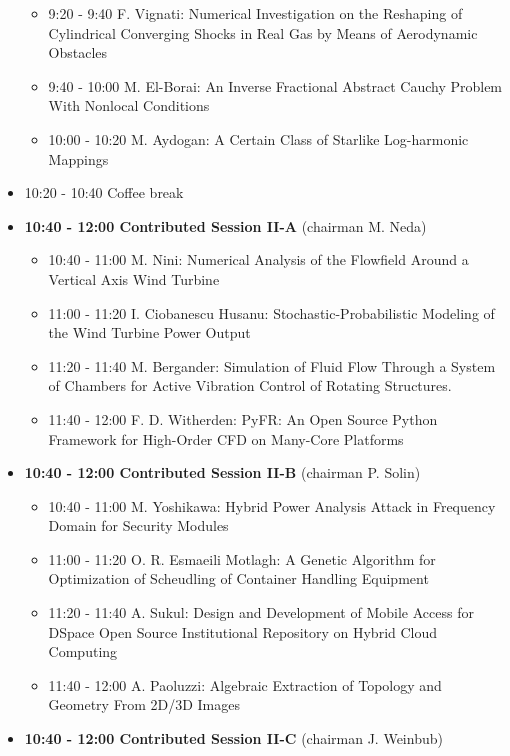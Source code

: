 \documentclass[10pt]{article}%
\begin{document}
\begin{itemize}
\begin{itemize}
    \item 9:20 - 9:40 {F. Vignati}: {Numerical Investigation on the Reshaping of Cylindrical Converging Shocks in Real Gas by Means of Aerodynamic Obstacles}
    \item 9:40 - 10:00 {M. El-Borai}: {An Inverse Fractional Abstract Cauchy Problem With Nonlocal Conditions} 
    \item 10:00 - 10:20 {M. Aydogan}: {A Certain Class of Starlike Log-harmonic Mappings}
  \end{itemize}
  \item 10:20 - 10:40 Coffee break
  \item {\bf 10:40 - 12:00 Contributed Session II-A} (chairman M. Neda) 
  \begin{itemize}
    \item 10:40 - 11:00 {M. Nini}: {Numerical Analysis of the Flowfield Around a Vertical Axis Wind Turbine}
    \item 11:00 - 11:20 {I. Ciobanescu Husanu}: {Stochastic-Probabilistic Modeling of the Wind Turbine Power Output}
    \item 11:20 - 11:40 {M. Bergander}: {Simulation of Fluid Flow Through a System of Chambers for Active Vibration Control of Rotating Structures.} %
    \item 11:40 - 12:00 {F. D. Witherden}: {PyFR: An Open Source Python Framework for High-Order CFD on Many-Core Platforms}
  \end{itemize}
  \item {\bf 10:40 - 12:00 Contributed Session II-B} (chairman P. Solin) 
  \begin{itemize}
    \item 10:40 - 11:00 {M. Yoshikawa}: {Hybrid Power Analysis Attack in Frequency Domain for Security Modules}
    \item 11:00 - 11:20 {O. R. Esmaeili Motlagh}: {A Genetic Algorithm for Optimization of Scheudling of Container Handling Equipment}
    \item 11:20 - 11:40 {A. Sukul}: {Design and Development of Mobile Access for DSpace Open Source Institutional Repository on Hybrid Cloud Computing} %
    \item 11:40 - 12:00 {A. Paoluzzi}: {Algebraic Extraction of Topology and Geometry From 2D/3D Images}
    \end{itemize}
    \newpage
  \item {\bf 10:40 - 12:00 Contributed Session II-C} (chairman J. Weinbub) 
  \begin{itemize}

\end{itemize}
\end{itemize}
\end{document}

